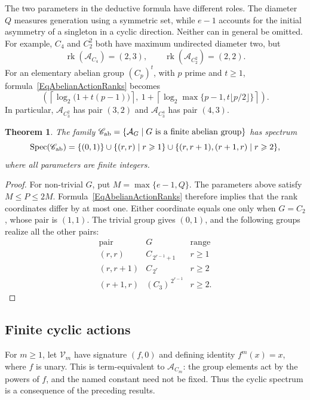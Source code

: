 \documentclass[12pt,english]{amsart}
\newtheorem{theorem}{Theorem}[section]
\theoremstyle{definition}
\numberwithin{equation}{section}
\theoremstyle{remark}
\begin{document}
The two parameters in the deductive formula have different roles.
The diameter $Q$ measures generation using a symmetric set, while
$e-1$ accounts for the initial asymmetry of a singleton in a cyclic
direction. Neither can in general be omitted. For example, $C_4$
and $C_2^2$ both have maximum undirected diameter two, but
\[
\operatorname{rk}(\mathcal A_{C_4})=(2,3),\qquad
\operatorname{rk}(\mathcal A_{C_2^2})=(2,2).
\]
For an elementary abelian group $(C_p)^t$, with $p$ prime and
$t\geqslant1$, formula~\eqref{EqAbelianActionRanks} becomes
\[
\left(
\left\lceil\log_2\bigl(1+t(p-1)\bigr)\right\rceil,\
1+\left\lceil\log_2\max\{p-1,t\lfloor p/2\rfloor\}\right\rceil
\right).
\]
In particular, $\mathcal A_{C_3^2}$ has pair $(3,2)$ and
$\mathcal A_{C_3^4}$ has pair $(4,3)$.

\begin{theorem}\label{ThmSpecialAbelianActionSpectrum}
The family $\mathscr C_{\rm ab}
=\{\mathcal A_G\mid G\text{ is a finite abelian group}\}$ has spectrum
\begin{equation}\label{EqAbelianActionSpectrum}
\operatorname{Spec}(\mathscr C_{\rm ab})
=\{(0,1)\}\cup\{(r,r)\mid r\geqslant1\}
 \cup\{(r,r+1),(r+1,r)\mid r\geqslant2\},
\end{equation}
where all parameters are finite integers.
\end{theorem}

\begin{proof}
For non-trivial $G$, put $M=\max\{e-1,Q\}$. The parameters above satisfy $M\leqslant P
\leqslant2M$. Formula~\eqref{EqAbelianActionRanks} therefore implies
that the rank coordinates differ by at most one. Either coordinate
equals one only when $G=C_2$, whose pair is $(1,1)$.
The trivial group gives $(0,1)$, and the following groups realize
all the other pairs:
\[
\begin{array}{c|c|c}
\text{pair}&G&\text{range}\\ \hline
(r,r)&C_{\,2^{r-1}+1}&r\geqslant1\\
(r,r+1)&C_{\,2^r}&r\geqslant2\\
(r+1,r)&(C_3)^{\,2^{r-1}}&r\geqslant2.
\end{array}
\]
\end{proof}

\subsection{Finite cyclic actions}\label{SubsecCyclicSpectrum}

For $m\geqslant1$, let $\mathcal V_m$ have signature $(f,0)$ and
defining identity $f^m(x)=x$, where $f$ is unary. This is
term-equivalent to $\mathcal A_{C_m}$: the group elements act
by the powers of $f$, and the named constant need not be fixed.
Thus the cyclic spectrum is a consequence of the preceding results.
\end{document}
